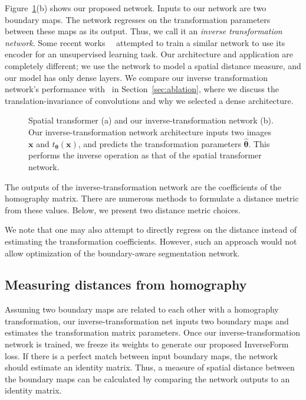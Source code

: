 \documentclass[final]{cvpr}
\begin{document}
Figure~\ref{fig:affine_transform}(b) shows our proposed network. Inputs to our network are two boundary maps. The network regresses on the transformation parameters between these maps as its output. Thus, we call it an \emph{inverse transformation network}. Some recent works~\cite{aetv2}~\cite{zhang2019aet} attempted to train a similar network to use its encoder for an unsupervised learning task. Our architecture and application are completely different; we use the network to model a spatial distance measure, and our model has only dense layers. We compare our inverse transformation network's performance with~\cite{aetv2} in Section~\ref{sec:ablation}, where we discuss the translation-invariance of convolutions and why we selected a dense architecture.

\begin{figure}[t]
\centering
{}\vspace{0.2cm}
\caption{Spatial transformer (a) and our inverse-transformation network (b). Our inverse-transformation network architecture inputs two images \(\boldsymbol{x}\) and \(t_{\boldsymbol{\theta}}(\boldsymbol{x})\), and predicts the transformation parameters \(\hat{\boldsymbol{\theta}}\). This performs the inverse operation as that of the spatial transformer network. 
  }
  \label{fig:affine_transform}
\end{figure}

The outputs of the inverse-transformation network are the coefficients of the homography matrix. There are numerous methods to formulate a distance metric from these values. Below, we present two distance metric choices. 

We note that one may also attempt to directly regress on the distance instead of estimating the transformation coefficients. However, such an approach would not allow optimization of the boundary-aware segmentation network.   



\subsection{Measuring distances from homography}\label{sec:distancemeasures}

Assuming two boundary maps are related to each other with a homography transformation, our inverse-transformation net inputs two boundary maps and estimates the transformation matrix parameters. Once our inverse-transformation network is trained, we freeze its weights to generate our proposed InverseForm loss. If there is a perfect match between input boundary maps, the network should estimate an identity matrix. Thus, a measure of spatial distance between the boundary maps can be calculated by comparing the network outputs to an identity matrix. 
\end{document}
